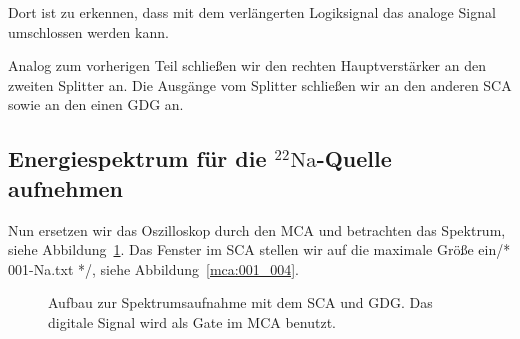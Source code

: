 Dort ist zu erkennen, dass mit dem verlängerten Logiksignal das analoge Signal
umschlossen werden kann.

Analog zum vorherigen Teil schließen wir den rechten Hauptverstärker an den
zweiten Splitter an. Die Ausgänge vom Splitter schließen wir an den anderen SCA
sowie an den einen GDG an.

\subsection{Energiespektrum für die ${}^{22}\text{Na}$-Quelle aufnehmen}

Nun ersetzen wir das Oszilloskop durch den MCA und betrachten das Spektrum,
siehe Abbildung~\ref{fig:aufbau:sca_gdg_mca}. Das
Fenster im SCA stellen wir auf die maximale Größe ein/* 001-Na.txt */, siehe
Abbildung~\ref{mca:001_004}.

\begin{figure}[htbp]
    \centering
    \caption{%
        Aufbau zur Spektrumsaufnahme mit dem SCA und GDG. Das digitale Signal
        wird als Gate im MCA benutzt.
    }
    \label{fig:aufbau:sca_gdg_mca}
\end{figure}

